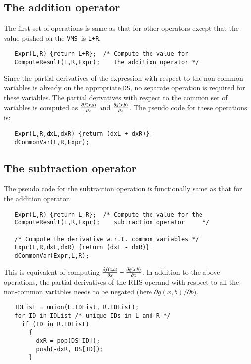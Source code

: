 \documentclass[11pt]{article}
\newcommand{\DS}{{\tt DS}}
\newcommand{\VMS}{{\tt VMS}}
\begin{document}
\subsection{The addition operator}

The first set of operations is same as that for other operators except
that the value pushed on the \VMS\ is {\tt L+R}.
\begin{verbatim}
   Expr(L,R) {return L+R};  /* Compute the value for 
   ComputeResult(L,R,Expr);    the addition operator */
\end{verbatim}
Since the partial derivatives of the expression with respect to the
non-common variables is already on the appropriate \DS, no separate
operation is required for these variables.  The partial derivatives
with respect to the common set of variables is computed as ${\partial
f(x,a) \over {\partial x}}$ and ${\partial g(x,b) \over {\partial
x}}$.  The pseudo code for these operations is:
\begin{verbatim}
   Expr(L,R,dxL,dxR) {return (dxL + dxR)};
   dCommonVar(L,R,Expr);
\end{verbatim}
%
%
\subsection{The subtraction operator}

The pseudo code for the subtraction operation is functionally same as
that for the addition operator.
\begin{verbatim}
   Expr(L,R) {return L-R};  /* Compute the value for the 
   ComputeResult(L,R,Expr);    subtraction operator     */

   /* Compute the derivative w.r.t. common variables */
   Expr(L,R,dxL,dxR) {return (dxL - dxR)};
   dCommonVar(Expr,L,R);
\end{verbatim}
This is equivalent of computing ${\partial f(x,a) \over {\partial
    x}}-{\partial g(x,b) \over {\partial x}}$.  In addition to the
above operations, the partial derivatives of the RHS operand with
respect to all the non-common variables needs to be negated (here
$\partial g(x,b) / \partial b$).
\begin{verbatim}
   IDList = union(L.IDList, R.IDList);
   for ID in IDList /* unique IDs in L and R */
     if (ID in R.IDList)
       {
         dxR = pop(DS[ID]);
         push(-dxR, DS[ID]);
       }
\end{verbatim}
  
\end{document}
